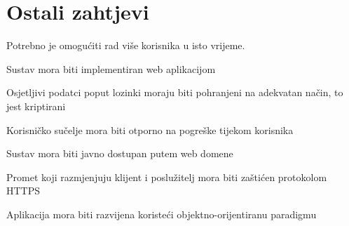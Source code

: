 		\section{Ostali zahtjevi}
			\begin{packed_item}
				\item Potrebno je omogućiti rad više korisnika u isto vrijeme.
				\item Sustav mora biti implementiran web aplikacijom
				\item Osjetljivi podatci poput lozinki moraju biti pohranjeni na adekvatan način, to jest kriptirani
				\item Korisničko sučelje mora biti otporno na pogreške tijekom korisnika
				\item Sustav mora biti javno dostupan putem web domene 
				\item Promet koji razmjenjuju klijent i poslužitelj mora biti zaštićen protokolom HTTPS
				\item Aplikacija mora biti razvijena koristeći objektno-orijentiranu paradigmu
			\end{packed_item}
%		 
			 
			 
			 
	